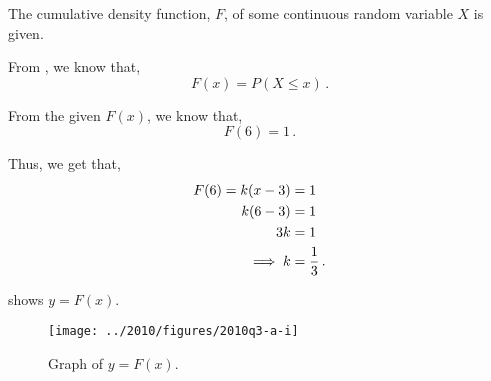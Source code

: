 %
%


\begin{subquestions}
	
\subquestion

The cumulative density function, $F$, of some continuous random variable $X$ is given.

\begin{subsubquestions}
	
\subsubquestion

From , we know that,
\begin{equation}
	F(x) = P(X \leq x) \,.
\end{equation}
	
From the given $F(x)$, we know that,
\begin{equation}
	F(6) = 1 \,.
\end{equation}

Thus, we get that,
\begin{align}
	F(6) = k(x-3) & = 1 \nonumber \\
	       k(6-3) & = 1 \nonumber \\
	       3k & = 1 \nonumber \\
	       \implies k & = \frac{1}{3} \,.
\end{align}

 shows $y=F(x)$.
\begin{figure}[H]
	\begin{center}
		\texttt{[image: ../2010/figures/2010q3-a-i]}
		\caption{\label{2010:q3:fig:FGraph} Graph of $y=F(x)$.}
	\end{center}
\end{figure}


\subsubquestion


\end{subsubquestions}
\end{subquestions}
